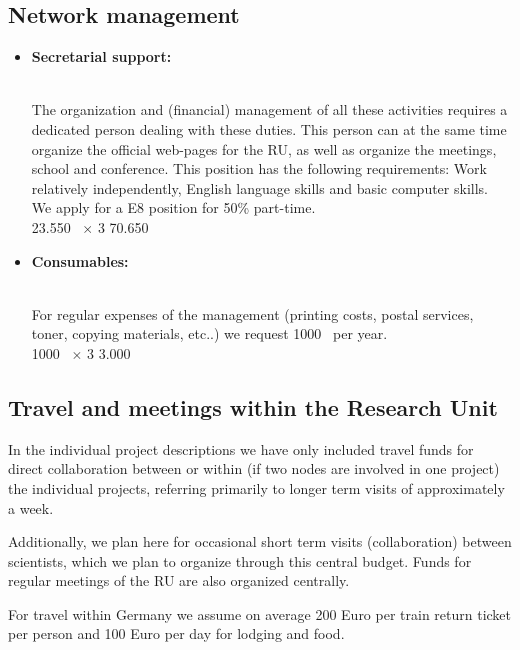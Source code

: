 \documentclass[10pt,fleqn,twoside,a4paper]{article}
\begin{document}
\subsection{Network management}
\begin{itemize}
\item
\begin{Emphasize}
{\bf Secretarial support:}
\end{Emphasize}\\
The organization and (financial) management of all these activities requires
a dedicated person dealing with these duties. This person can at the same
time organize the official web-pages for the RU, as well as organize the
meetings, school and conference. This position has the following
requirements: Work relatively independently, English language skills and
basic computer skills. We apply for a E8 position for 50\% part-time.
\vspace{0.2em}\\
23.550~\EUR{} $\times$ 3              \hfill 70.650~\EUR{}\\
\item 
\begin{Emphasize}
{\bf Consumables:}
\end{Emphasize}\\
For regular expenses of the management (printing costs, postal services, toner,
copying materials, etc..) we request 1000~\EUR{} per year.
\vspace{0.2em}\\
1000~\EUR{} $\times$ 3              \hfill 3.000~\EUR{}\\
\end{itemize}

\subsection{Travel and meetings within the Research Unit}
In the individual project descriptions we have only included travel funds
for direct collaboration between or within (if two nodes are involved in one
project) the individual projects, referring primarily to longer term visits
of approximately a week.

Additionally, we plan here for  occasional short term visits
(collaboration) between scientists, which we plan to organize through this
central budget. Funds for regular meetings of the RU are also organized
centrally. 

For travel within Germany we assume on average 200 Euro per train return ticket
per person and 100 Euro per day for lodging and food. 
\end{document}
